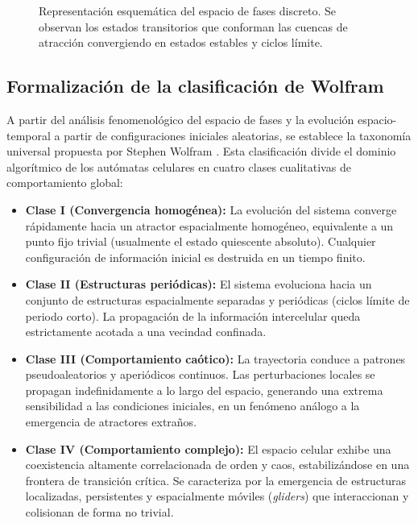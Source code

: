 \begin{figure}[h]
\centering
\caption{Representación esquemática del espacio de fases discreto. Se observan los estados transitorios que conforman las cuencas de atracción convergiendo en estados estables y ciclos límite.}
\label{fig:espacio_fases}
\end{figure}

\subsection{Formalización de la clasificación de Wolfram}

A partir del análisis fenomenológico del espacio de fases y la evolución espacio-temporal a partir de configuraciones iniciales aleatorias, se establece la taxonomía universal propuesta por Stephen Wolfram \cite{Wolfram2002}. Esta clasificación divide el dominio algorítmico de los autómatas celulares en cuatro clases cualitativas de comportamiento global:

\begin{itemize}
    \item \textbf{Clase I (Convergencia homogénea):} La evolución del sistema converge rápidamente hacia un atractor espacialmente homogéneo, equivalente a un punto fijo trivial (usualmente el estado quiescente absoluto). Cualquier configuración de información inicial es destruida en un tiempo finito.
    \item \textbf{Clase II (Estructuras periódicas):} El sistema evoluciona hacia un conjunto de estructuras espacialmente separadas y periódicas (ciclos límite de periodo corto). La propagación de la información intercelular queda estrictamente acotada a una vecindad confinada.
    \item \textbf{Clase III (Comportamiento caótico):} La trayectoria conduce a patrones pseudoaleatorios y aperiódicos continuos. Las perturbaciones locales se propagan indefinidamente a lo largo del espacio, generando una extrema sensibilidad a las condiciones iniciales, en un fenómeno análogo a la emergencia de atractores extraños.
    \item \textbf{Clase IV (Comportamiento complejo):} El espacio celular exhibe una coexistencia altamente correlacionada de orden y caos, estabilizándose en una frontera de transición crítica. Se caracteriza por la emergencia de estructuras localizadas, persistentes y espacialmente móviles (\textit{gliders}) que interaccionan y colisionan de forma no trivial.
\end{itemize}

